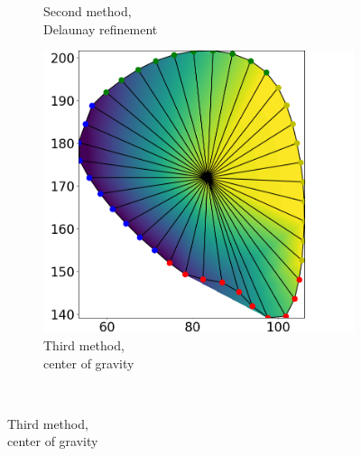 \begin{figure}
\begin{subfigure}[t]{0.31\textwidth}
    \caption{Second method,\\Delaunay refinement}%
    \label{fig:triu_1}%
  \end{subfigure}
  \quad
  \begin{subfigure}[t]{0.31\textwidth}%
    \centering%
    \includegraphics[width=\textwidth]{images/fiber_creation/u_2.png}%
    \caption{Third method,\\center of gravity}%
    \label{fig:triu_2}%
  \end{subfigure}\\
  

\end{figure}
